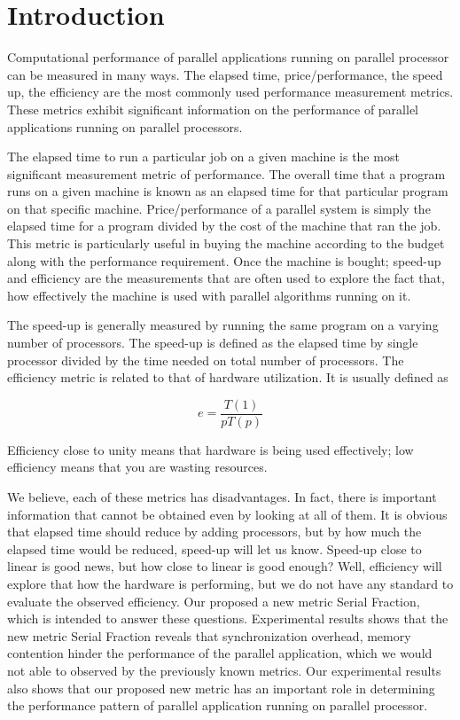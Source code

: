 \section{Introduction}
Computational performance of parallel applications running on parallel processor can be measured in many ways. The elapsed time, price/performance, the speed up, the efficiency are the most commonly used performance measurement metrics. These metrics exhibit significant information on the performance of parallel applications running on parallel processors.

The elapsed time to run a particular job on a given machine is the most significant measurement metric  of performance. The overall time that a program runs on a given machine is known as an elapsed time for that particular program on that specific machine. Price/performance of a parallel system is simply the elapsed time for a program divided by the cost of the machine that ran the job. This metric is particularly useful in buying the machine according to the budget along with the performance requirement. Once the machine is bought; speed-up and efficiency are the measurements that are often used to explore the fact that, how effectively the machine is used with parallel algorithms running on it.

The speed-up is generally measured by running the same program on a varying number of processors. The speed-up is defined as the elapsed time by single processor divided by the time needed on total number of processors. The efficiency metric is related to that of hardware utilization. It is usually defined as

\begin{equation}
e=\frac{T(1)}{pT(p)}
\end{equation}

Efficiency close to unity means that hardware is being used effectively; low efficiency means that you are wasting resources.

We believe, each of these metrics has disadvantages. In fact, there is important information that cannot be obtained
even by looking at all of them. It is obvious that elapsed time should reduce by adding processors, but by how much  the elapsed time would be reduced, speed-up will let us know. Speed-up close to linear is good news, but how close to linear is good enough? Well, efficiency will explore that how the hardware is performing, but we do not have any standard to evaluate the observed efficiency. Our proposed a new metric Serial Fraction, which is intended to answer these questions. Experimental results shows that the new metric Serial Fraction reveals that synchronization overhead, memory contention hinder the performance of the parallel application, which we would not able to observed by the previously known metrics. Our experimental results also shows that our proposed new metric has an important role in determining the performance pattern of parallel application running on parallel processor.

